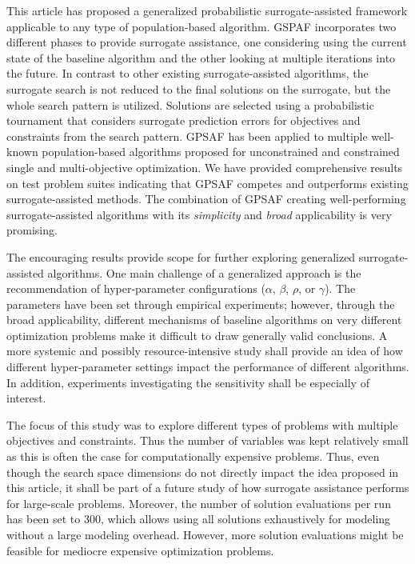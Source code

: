 \documentclass[journal]{IEEEtran}
\begin{document}
This article has proposed a generalized probabilistic surrogate-assisted framework applicable to any type of population-based algorithm. GSPAF incorporates two different phases to provide surrogate assistance, one considering using the current state of the baseline algorithm and the other looking at multiple iterations into the future. In contrast to other existing surrogate-assisted algorithms, the surrogate search is not reduced to the final solutions on the surrogate, but the whole search pattern is utilized. Solutions are selected using a probabilistic tournament that considers surrogate prediction errors for objectives and constraints from the search pattern. 
GPSAF has been applied to multiple well-known population-based algorithms proposed for unconstrained and constrained single and multi-objective optimization. We have provided comprehensive results on test problem suites indicating that GPSAF competes and outperforms existing surrogate-assisted methods. The combination of GPSAF creating well-performing surrogate-assisted algorithms with its \emph{simplicity} and \emph{broad} applicability is very promising.


The encouraging results provide scope for further exploring generalized surrogate-assisted algorithms. One main challenge of a generalized approach is the recommendation of hyper-parameter configurations ($\alpha$, $\beta$, $\rho$, or $\gamma$). The parameters have been set through empirical experiments; however, through the broad applicability, different mechanisms of baseline algorithms on very different optimization problems make it difficult to draw generally valid conclusions. A more systemic and possibly resource-intensive study shall provide an idea of how different hyper-parameter settings impact the performance of different algorithms. In addition, experiments investigating the sensitivity shall be especially of interest.


The focus of this study was to explore different types of problems with multiple objectives and constraints. Thus the number of variables was kept relatively small as this is often the case for computationally expensive problems. Thus, even though the search space dimensions do not directly impact the idea proposed in this article, it shall be part of a future study of how surrogate assistance performs for large-scale problems. Moreover, the number of solution evaluations per run has been set to $300$, which allows using all solutions exhaustively for modeling without a large modeling overhead. However, more solution evaluations might be feasible for mediocre expensive optimization problems.
\end{document}
